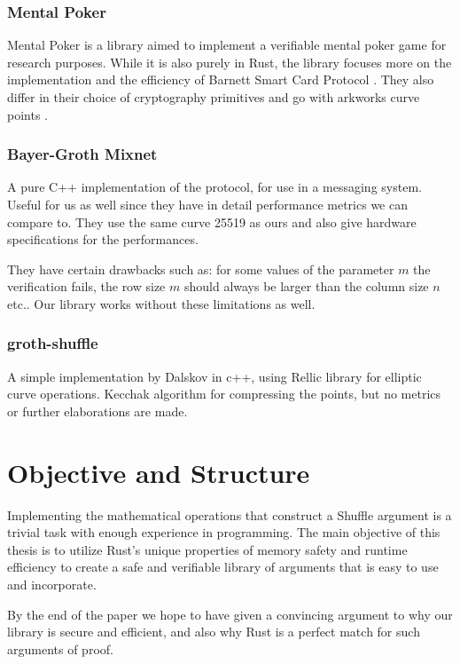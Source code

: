 \documentclass[12pt,a4paper]{report}
\begin{document}
\subsection*{Mental Poker}
Mental Poker \cite{mentalpoker} is a library aimed to implement a verifiable
mental poker game for research purposes. While it is also purely in Rust,
the library focuses more on the implementation and the efficiency of 
Barnett Smart Card Protocol \cite{Barnett}. They also differ in their choice
of cryptography primitives and go with arkworks curve points \cite{arkworks}. 
\subsection*{Bayer-Groth Mixnet}
A pure C++ implementation \cite{bgmixnet} of the protocol, for use in a messaging system.
Useful for us as well since they have in detail performance metrics we can
compare to. They use the same curve 25519 as ours and also give hardware specifications for the performances.\par
They have certain drawbacks such as: for some values of the parameter $m$ the 
verification fails, the row size $m$ should always be larger than the column size $n$ etc.. 
Our library works without these limitations as well.
\subsection*{groth-shuffle}
A simple implementation by Dalskov \cite{andshuf} in c++, using Rellic library for elliptic curve operations.
Kecchak algorithm for compressing the points, but no metrics or further elaborations are made.

\chapter{Objective and Structure}
Implementing the mathematical operations that construct a Shuffle argument is a trivial task with enough experience in programming. The main objective of this thesis is to utilize Rust's unique properties of memory safety and runtime efficiency to create a safe and verifiable library of arguments that is easy to use and incorporate.\par
By the end of the paper we hope to have given a convincing argument to why our library is secure and efficient, and also why Rust is a perfect match for such arguments of proof.
\end{document}
